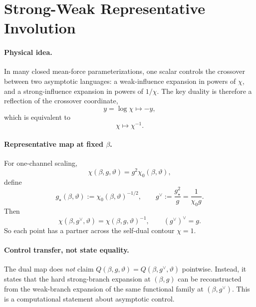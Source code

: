 \section{Strong-Weak Representative Involution}
\label{sec:strong_weak_involution}

\paragraph{Physical idea.}
In many closed mean-force parameterizations, one scalar controls the crossover between two asymptotic
languages: a weak-influence expansion in powers of \(\chi\), and a strong-influence expansion in
powers of \(1/\chi\).
The key duality is therefore a reflection of the crossover coordinate,
\begin{equation}
  y=\log\chi \longmapsto -y,
\end{equation}
which is equivalent to
\begin{equation}
  \chi\longmapsto \chi^{-1}.
\end{equation}

\paragraph{Representative map at fixed \(\beta\).}
For one-channel scaling,
\begin{equation}
  \chi(\beta,g,\vartheta)=g^2\chi_0(\beta,\vartheta),
\end{equation}
define
\begin{equation}
  g_\star(\beta,\vartheta):=\chi_0(\beta,\vartheta)^{-1/2},
  \qquad
  g^\vee:=\frac{g_\star^2}{g}=\frac{1}{\chi_0 g}.
\end{equation}
Then
\begin{equation}
  \chi(\beta,g^\vee,\vartheta)=\chi(\beta,g,\vartheta)^{-1},
  \qquad
  (g^\vee)^\vee=g.
\end{equation}
So each point has a partner across the self-dual contour \(\chi=1\).

\paragraph{Control transfer, not state equality.}
The dual map does \emph{not} claim
\(Q(\beta,g,\vartheta)=Q(\beta,g^\vee,\vartheta)\) pointwise.
Instead, it states that the hard strong-branch expansion at \((\beta,g)\) can be reconstructed from
the weak-branch expansion of the same functional family at \((\beta,g^\vee)\).
This is a computational statement about asymptotic control.

